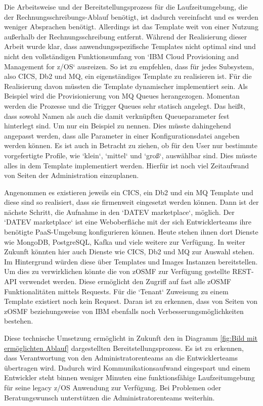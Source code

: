 Die Arbeitsweise und der Bereitstellungsprozess für die Laufzeitumgebung, die der Rechnungsschreibungs-Ablauf benötigt, ist dadurch vereinfacht und es werden weniger Absprachen benötigt.
Allerdings ist das Template weit von einer Nutzung außerhalb der Rechnungsschreibung entfernt.
Während der Realisierung dieser Arbeit wurde klar, dass anwendungsspezifische Templates nicht optimal sind und nicht den vollständigen Funktionsumfang von `IBM Cloud Provisioning and Management for z/OS` ausreizen.
So ist zu empfehlen, dass für jedes Subsystem, also CICS, Db2 und MQ, ein eigenständiges Template zu realisieren ist.
Für die Realisierung davon müssten die Template dynamischer implementiert sein.
Als Beispiel wird die Provisionierung von MQ Queues herangezogen.
Momentan werden die Prozesse und die Trigger Queues sehr statisch angelegt.
Das heißt, dass sowohl Namen als auch die damit verknüpften Queueparameter fest hinterlegt sind.
Um nur ein Beispiel zu nennen.
Dies müsste dahingehend angepasst werden, dass alle Parameter in einer Konfigurationsdatei angeben werden können.
Es ist auch in Betracht zu ziehen, ob für den User nur bestimmte vorgefertigte Profile, wie `klein`, `mittel` und `groß`, auswählbar sind.
Dies müsste alles in dem Template implementiert werden.
Hierfür ist noch viel Zeitaufwand von Seiten der Administration einzuplanen.

Angenommen es existieren jeweils ein CICS, ein Db2 und ein MQ Template und diese sind so realisiert, dass sie firmenweit eingesetzt werden können.
Dann ist der nächste Schritt, die Aufnahme in den `DATEV marketplace`, möglich.
Der `DATEV marketplace` ist eine Weboberfläche mit der sich Entwicklerteams ihre benötigte PaaS-Umgebung konfigurieren können.
Heute stehen ihnen dort Dienste wie MongoDB, PostgreSQL, Kafka und viele weitere zur Verfügung.
In weiter Zukunft könnten hier auch Dienste wie CICS, Db2 und MQ zur Auswahl stehen.
Im Hintergrund würden diese über Templates und Images Instanzen bereitstellen.
Um dies zu verwirklichen könnte die von zOSMF zur Verfügung gestellte REST-API verwendet werden.
Diese ermöglicht den Zugriff auf fast alle zOSMF Funktionalitäten mittels Requests.
Für die `Tenant` Zuweisung zu einem Template existiert noch kein Request.
Daran ist zu erkennen, dass von Seiten von zOSMF beziehungsweise von IBM ebenfalls noch Verbesserungsmöglichkeiten bestehen.

Diese technische Umsetzung ermöglicht in Zukunft den in Diagramm \ref{fig:Bild mit ermöglichten Ablauf} dargestellten Bereitstellungsprozess.
Es ist zu erkennen, dass Verantwortung von den Administratorenteams an die Entwicklerteams übertragen wird.
Dadurch wird Kommunikationsaufwand eingespart und einem Entwickler steht binnen weniger Minuten eine funktionsfähige Laufzeitumgebung für seine legacy z/OS Anwendung zur Verfügung.
Bei Problemen oder Beratungswunsch unterstützen die Administratorenteams weiterhin.

